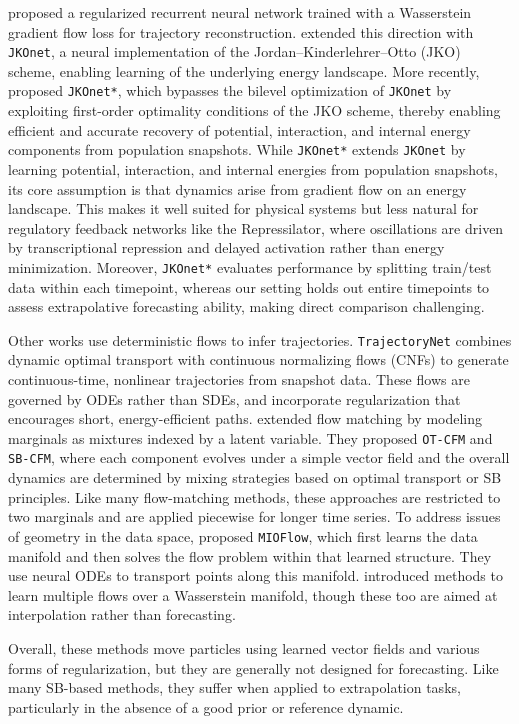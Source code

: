 \citet{hashimoto2016learning} proposed a regularized recurrent neural network trained with a Wasserstein gradient flow loss for trajectory reconstruction. \citet{bunne2022proximal} extended this direction with \texttt{JKOnet}, a neural implementation of the Jordan–Kinderlehrer–Otto (JKO) scheme, enabling learning of the underlying energy landscape. More recently, \citet{terpin2024learning} proposed \texttt{JKOnet*}, which bypasses the bilevel optimization of \texttt{JKOnet} by exploiting first-order optimality conditions of the JKO scheme, thereby enabling efficient and accurate recovery of potential, interaction, and internal energy components from population snapshots. While \texttt{JKOnet*} extends \texttt{JKOnet} by learning potential, interaction, and internal energies from population snapshots, its core assumption is that dynamics arise from gradient flow on an energy landscape. This makes it well suited for physical systems but less natural for regulatory feedback networks like the Repressilator, where oscillations are driven by transcriptional repression and delayed activation rather than energy minimization. Moreover, \texttt{JKOnet*} evaluates performance by splitting train/test data within each timepoint, whereas our setting holds out entire timepoints to assess extrapolative forecasting ability, making direct comparison challenging. 

Other works use deterministic flows to infer trajectories. \texttt{TrajectoryNet} \citep{tong2020trajectorynet} combines dynamic optimal transport with continuous normalizing flows (CNFs) to generate continuous-time, nonlinear trajectories from snapshot data. These flows are governed by ODEs rather than SDEs, and incorporate regularization that encourages short, energy-efficient paths. \citet{tong2023improving} extended flow matching by modeling marginals as mixtures indexed by a latent variable. They proposed \texttt{OT-CFM} and \texttt{SB-CFM}, where each component evolves under a simple vector field and the overall dynamics are determined by mixing strategies based on optimal transport or SB principles. Like many flow-matching methods, these approaches are restricted to two marginals and are applied piecewise for longer time series. To address issues of geometry in the data space, \citet{huguet2022manifold} proposed \texttt{MIOFlow}, which first learns the data manifold and then solves the flow problem within that learned structure. They use neural ODEs to transport points along this manifold. \citet{atanackovic2024meta} introduced methods to learn multiple flows over a Wasserstein manifold, though these too are aimed at interpolation rather than forecasting. 

Overall, these methods move particles using learned vector fields and various forms of regularization, but they are generally not designed for forecasting. Like many SB-based methods, they suffer when applied to extrapolation tasks, particularly in the absence of a good prior or reference dynamic. 

